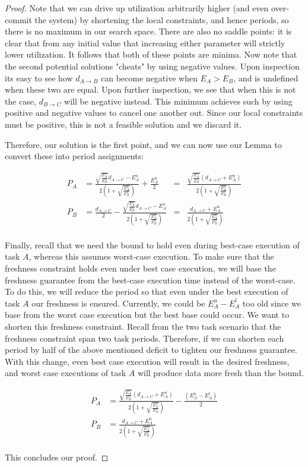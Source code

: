 \begin{proof}
	Note that we can drive up utilization arbitrarily higher (and even over-commit the system) by shortening the local constraints, and hence periods, so there is no maximum in our search space. There are also no saddle points: it is clear that from any initial value that increasing either parameter will strictly lower utilization. It follows that both of these points are minima. Now note that the second potential solutions "cheats" by using negative values. Upon inspection its easy to see how $d_{A \to B}$ can become negative when $E_A > E_B$, and is undefined when these two are equal. Upon further inspection, we see that when this is not the case, $d_{B \to C}$ will be negative instead. This minimum achieves such by using positive and negative values to cancel one another out. Since our local constraints must be positive, this is not a feasible solution and we discard it.
	
	Therefore, our solution is the first point, and we can now use our Lemma to convert these into period assignments:
	
	\begin{align*}
		P_A &= \frac{\sqrt{\frac{E^u_A}{E^u_B}}d_{A \to C}-E^u_A}{2(1+\sqrt{\frac{E^u_A}{E^u_B}})} + \frac{E^u_A}{2} &=& \frac{\sqrt{\frac{E^u_A}{E^u_B}}(d_{A \to C}+E^u_A)}{2(1+\sqrt{\frac{E^u_A}{E^u_B}})}\\
		P_B &= \frac{d_{A \to C}}{2} - \frac{\sqrt{\frac{E^u_A}{E^u_B}}d_{A \to C}-E^u_A}{2(1+\sqrt{\frac{E^u_A}{E^u_B}})} &=& \frac{d_{A \to C}+E^u_A}{2(1+\sqrt{\frac{E^u_A}{E^u_B}})}\\
	\end{align*}
	
	Finally, recall that we need the bound to hold even during best-case execution of task $A$, whereas this assumes worst-case execution. To make sure that the freshness constraint holds even under best case execution, we will base the freshness guarantee from the best-case execution time instead of the worst-case. To do this, we will reduce the period so that even under the best execution of task $A$ our freshness is ensured. Currently, we could be $E^u_A - E^l_A$ too old since we base from the worst case execution but the best base could occur. We want to shorten this freshness constraint. Recall from the two task scenario that the freshness constraint span two task periods. Therefore, if we can shorten each period by half of the above mentioned deficit to tighten our freshness guarantee. With this change, even best case execution will result in the desired freshness, and worst case executions of task $A$ will produce data more fresh than the bound.
	
	\begin{align*}
		P_A &= \frac{\sqrt{\frac{E^u_A}{E^u_B}}(d_{A \to C}+E^u_A)}{2(1+\sqrt{\frac{E^u_A}{E^u_B}})} - \frac{(E^u_A - E^l_A)}{2}\\
		P_B &= \frac{d_{A \to C}+E^u_A}{2(1+\sqrt{\frac{E^u_A}{E^u_B}})}\\
	\end{align*}
	
	This concludes our proof.
\end{proof}

